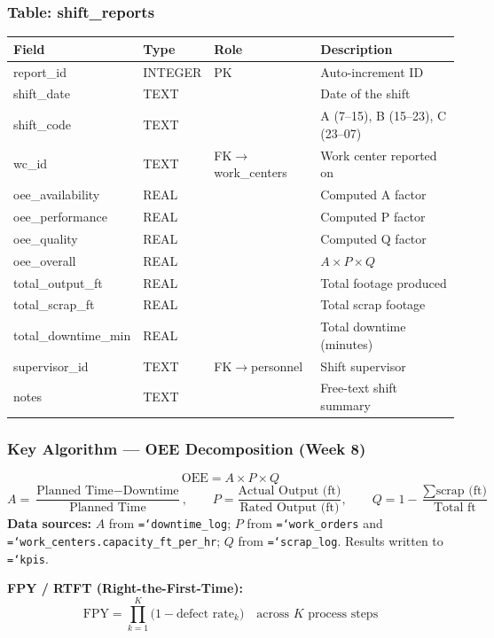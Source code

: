\documentclass[11pt]{article}
\newcommand{\tfield}[1]{\texttt{\hyphenchar\font=`\-\relax #1}}
\begin{document}
\subsubsection*{Table: shift\_reports}
\begin{table}[H]\centering\small
\begin{tabular}{@{} l l l L{5.0cm} @{}}
\toprule
\textbf{Field} & \textbf{Type} & \textbf{Role} & \textbf{Description} \\
\midrule
report\_id        & INTEGER & PK  & Auto-increment ID \\
shift\_date       & TEXT    &     & Date of the shift \\
shift\_code       & TEXT    &     & A (7--15), B (15--23), C (23--07) \\
wc\_id            & TEXT    & FK$\to$work\_centers & Work center reported on \\
oee\_availability & REAL    &     & Computed A factor \\
oee\_performance  & REAL    &     & Computed P factor \\
oee\_quality      & REAL    &     & Computed Q factor \\
oee\_overall      & REAL    &     & $A \times P \times Q$ \\
total\_output\_ft & REAL    &     & Total footage produced \\
total\_scrap\_ft  & REAL    &     & Total scrap footage \\
total\_downtime\_min & REAL &     & Total downtime (minutes) \\
supervisor\_id    & TEXT    & FK$\to$personnel & Shift supervisor \\
notes            & TEXT    &     & Free-text shift summary \\
\bottomrule
\end{tabular}
\end{table}

\subsubsection*{Key Algorithm --- OEE Decomposition (Week 8)}

\begin{eqbox}[F11 --- OEE = Availability $\times$ Performance $\times$ Quality]
\[
\text{OEE} = A \times P \times Q
\]
\[
A = \frac{\text{Planned Time} - \text{Downtime}}{\text{Planned Time}}, \qquad P = \frac{\text{Actual Output (ft)}}{\text{Rated Output (ft)}}, \qquad Q = 1 - \frac{\sum \text{scrap (ft)}}{\text{Total ft}}
\]
\textbf{Data sources:} $A$ from \tfield{downtime\_log};\; $P$ from \tfield{work\_orders} and \tfield{work\_centers.capacity\_ft\_per\_hr};\; $Q$ from \tfield{scrap\_log}.  Results written to \tfield{kpis}.

\textbf{FPY / RTFT (Right-the-First-Time):}
\[
\text{FPY} = \prod_{k=1}^{K} \bigl(1 - \text{defect rate}_k\bigr) \quad \text{across } K \text{ process steps}
\]
\end{eqbox}
\end{document}
